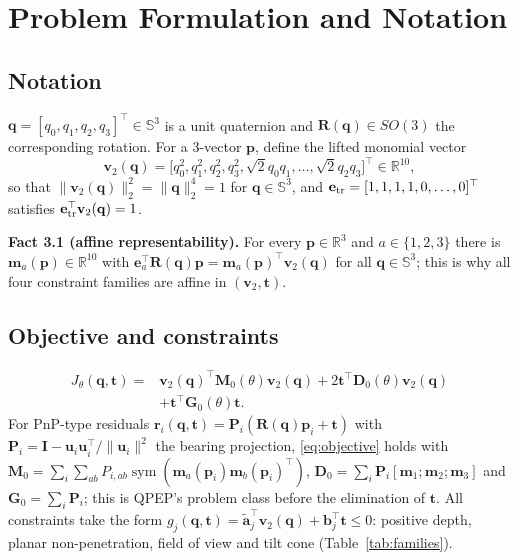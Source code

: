 \section{Problem Formulation and Notation}\label{sec:formulation}

\subsection{Notation}\label{sec:notation}
$\mathbf q=[q_0,q_1,q_2,q_3]^\top\in\mathbb{S}^3$ is a unit quaternion and $\mathbf R(\mathbf q)\in SO(3)$ the corresponding rotation. For a 3-vector $\mathbf p$, define the lifted monomial vector
\begin{equation}
\mathbf v_2(\mathbf q)=\big[q_0^2,q_1^2,q_2^2,q_3^2,\sqrt2 q_0q_1,\dots,\sqrt2 q_2q_3\big]^\top\in\mathbb{R}^{10},
\label{eq:v2}
\end{equation}
so that $\|\mathbf v_2(\mathbf q)\|_2^2=\|\mathbf q\|_2^4=1$ for $\mathbf q\in\mathbb{S}^3$, and $\mathbf e_{\rm tr}=[1,1,1,1,0,\dots,0]^\top$ satisfies $\mathbf e_{\rm tr}^\top\mathbf v_2(\mathbf q)=1$.

\textbf{Fact 3.1 (affine representability).} For every $\mathbf p\in\mathbb{R}^3$ and $a\in\{1,2,3\}$ there is $\mathbf m_a(\mathbf p)\in\mathbb{R}^{10}$ with $\mathbf e_a^\top\mathbf R(\mathbf q)\mathbf p=\mathbf m_a(\mathbf p)^\top\mathbf v_2(\mathbf q)$ for all $\mathbf q\in\mathbb{S}^3$; this is why all four constraint families are affine in $(\mathbf v_2,\mathbf t)$.

\subsection{Objective and constraints}\label{sec:objective}
\begin{equation}
\begin{aligned}
J_\theta(\mathbf q,\mathbf t)={}&\mathbf v_2(\mathbf q)^\top\mathbf M_0(\theta)\mathbf v_2(\mathbf q)+2\mathbf t^\top\mathbf D_0(\theta)\mathbf v_2(\mathbf q)\\
&+\mathbf t^\top\mathbf G_0(\theta)\mathbf t .
\end{aligned}
\label{eq:objective}
\end{equation}
For PnP-type residuals $\mathbf r_i(\mathbf q,\mathbf t)=\mathbf P_i(\mathbf R(\mathbf q)\mathbf p_i+\mathbf t)$ with $\mathbf P_i=\mathbf I-\mathbf u_i\mathbf u_i^\top/\|\mathbf u_i\|^2$ the bearing projection, \eqref{eq:objective} holds with $\mathbf M_0=\sum_i\sum_{ab}P_{i,ab}\operatorname{sym}(\mathbf m_a(\mathbf p_i)\mathbf m_b(\mathbf p_i)^\top)$, $\mathbf D_0=\sum_i\mathbf P_i[\mathbf m_1;\mathbf m_2;\mathbf m_3]$ and $\mathbf G_0=\sum_i\mathbf P_i$; this is QPEP's problem class before the elimination of $\mathbf t$. All constraints take the form $g_j(\mathbf q,\mathbf t)=\tilde{\mathbf a}_j^\top\mathbf v_2(\mathbf q)+\mathbf b_j^\top\mathbf t\le0$: positive depth, planar non-penetration, field of view and tilt cone (Table~\ref{tab:families}).


